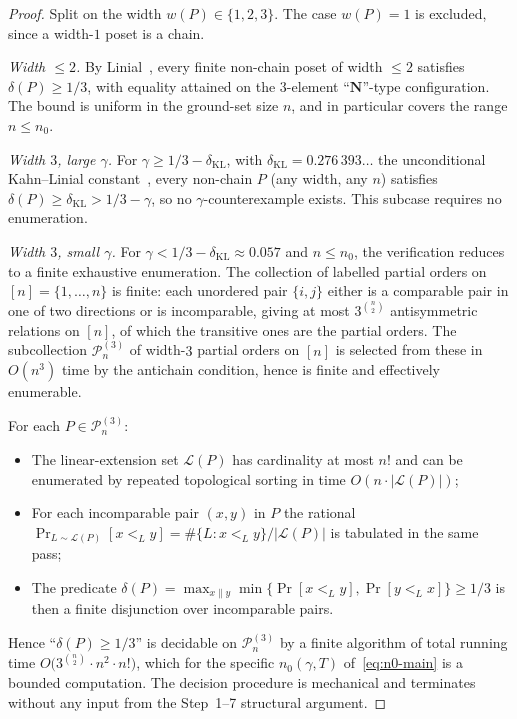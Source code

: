 \begin{proof}
Split on the width $w(P) \in \{1, 2, 3\}$. The case $w(P) = 1$ is
excluded, since a width-$1$ poset is a chain.

\emph{Width $\le 2$.} By Linial~\cite{Linial1984}, every finite
non-chain poset of width $\le 2$ satisfies $\delta(P) \ge 1/3$, with
equality attained on the $3$-element ``$\mathbf N$''-type
configuration. The bound is uniform in the ground-set size $n$, and in
particular covers the range $n \le n_0$.

\emph{Width $3$, large $\gamma$.} For
$\gamma \ge 1/3 - \delta_{\mathrm{KL}}$, with
$\delta_{\mathrm{KL}} = 0.276\,393\ldots$ the unconditional
Kahn--Linial constant~\cite{KahnLinial1991}, every non-chain
$P$ (any width, any $n$) satisfies
$\delta(P) \ge \delta_{\mathrm{KL}} > 1/3 - \gamma$, so no
$\gamma$-counter\-example exists. This sub\-case requires no
enumeration.

\emph{Width $3$, small $\gamma$.} For
$\gamma < 1/3 - \delta_{\mathrm{KL}} \approx 0.057$ and $n \le n_0$,
the verification reduces to a finite exhaustive enumeration. The
collection of labelled partial orders on $[n] = \{1,\dots,n\}$ is
finite: each unordered pair $\{i,j\}$ either is a comparable pair in
one of two directions or is incomparable, giving at most
$3^{\binom n 2}$ antisymmetric relations on $[n]$, of which the
transitive ones are the partial orders. The sub\-collection
$\mathcal P_n^{(3)}$ of width-$3$ partial orders on $[n]$ is selected
from these in $O(n^3)$ time by the antichain condition, hence is
finite and effectively enumerable.

For each $P \in \mathcal P_n^{(3)}$:
\begin{itemize}[nosep]
 \item The linear-extension set $\mathcal L(P)$ has cardinality at
  most $n!$ and can be enumerated by repeated topological sorting in
  time $O(n \cdot |\mathcal L(P)|)$;
 \item For each incomparable pair $(x, y)$ in $P$ the rational
  $\Pr_{L \sim \mathcal L(P)}[x <_L y] = \#\{L : x <_L y\}
  /|\mathcal L(P)|$ is tabulated in the same pass;
 \item The predicate
  $\delta(P) = \max_{x \parallel y} \min\{\Pr[x <_L y], \Pr[y <_L x]\}
  \ge 1/3$ is then a finite disjunction over incomparable pairs.
\end{itemize}
Hence ``$\delta(P) \ge 1/3$'' is decidable on $\mathcal P_n^{(3)}$ by
a finite algorithm of total running time
$O\!\big(3^{\binom{n}{2}} \cdot n^2 \cdot n!\big)$, which for the
specific $n_0(\gamma, T)$ of~\eqref{eq:n0-main} is a bounded
computation.  The decision procedure is mechanical and terminates
without any input from the Step~1--7 structural argument.


\end{proof}

